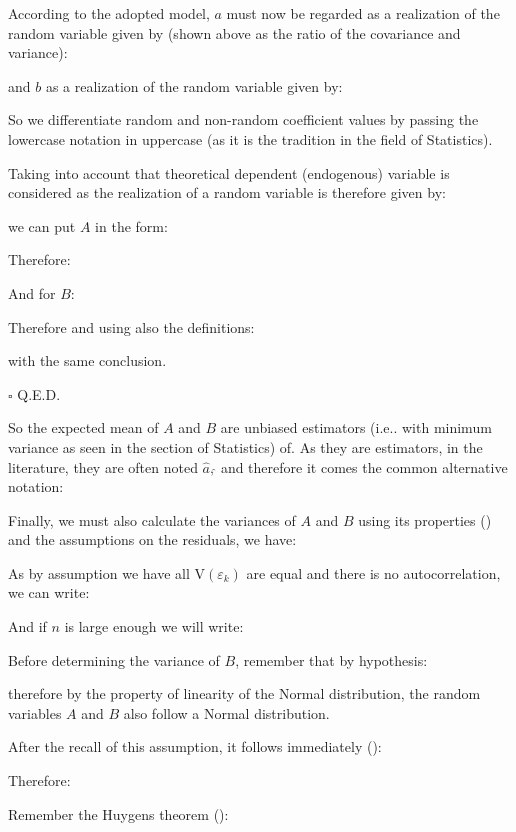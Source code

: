 	\begin{dem}
	According to the adopted model, $a$ must now be regarded as a realization of the random variable given by (shown above as the ratio of the covariance and variance):
	
	and $b$ as a realization of the random variable given by:
	
	So we differentiate random and non-random coefficient values by passing the lowercase notation in uppercase (as it is the tradition in the field of Statistics).
	
	Taking into account that theoretical dependent (endogenous) variable is considered as the realization of a random variable is therefore given by:
	
	we can put $A$ in the form:
	
	Therefore:
	
	
	And for $B$:
	
	Therefore and using also the definitions:
	
	with the same conclusion.
	\begin{flushright}
		$\square$  Q.E.D.
	\end{flushright}
	\end{dem}
	So the expected mean of $A$ and $B$ are unbiased estimators (i.e.. with minimum variance as seen in the section of Statistics) of. As they are estimators, in the literature, they are often noted $\hat{a},\hat{}$ and therefore it comes the common alternative notation:
		
	Finally, we must also calculate the variances of $A$ and $B$ using its properties () and the assumptions on the residuals, we have:
	
	As by assumption we have all $\text{V}(\varepsilon_k)$ are equal and there is no autocorrelation, we can write:
	
	And if $n$ is large enough we will write:
	
	Before determining the variance of $B$, remember that by hypothesis:
	
	therefore by the property of linearity of the Normal distribution, the random variables $A$ and $B$ also follow a Normal distribution.
	
	After the recall of this assumption, it follows immediately ():
	
	Therefore:
	
	Remember the Huygens theorem ():
	
